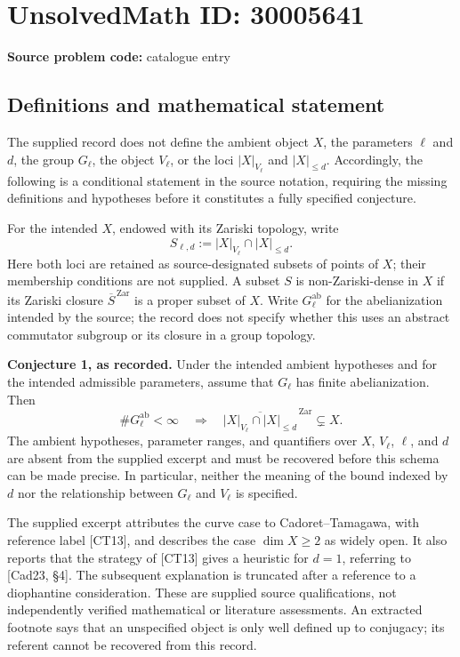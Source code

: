 \documentclass[11pt]{article}
\begin{document}
\section*{UnsolvedMath ID: 30005641}
\textbf{Source problem code:} catalogue entry
\subsection{Definitions and mathematical statement}
The supplied record does not define the ambient object \(X\), the parameters \(\ell\) and \(d\), the group \(G_\ell\), the object \(V_\ell\), or the loci \(|X|_{V_\ell}\) and \(|X|_{\leq d}\). Accordingly, the following is a conditional statement in the source notation, requiring the missing definitions and hypotheses before it constitutes a fully specified conjecture.

For the intended \(X\), endowed with its Zariski topology, write
\[
S_{\ell,d}:=|X|_{V_\ell}\cap |X|_{\leq d}.
\]
Here both loci are retained as source-designated subsets of points of \(X\); their membership conditions are not supplied. A subset \(S\) is non-Zariski-dense in \(X\) if its Zariski closure \(\overline{S}^{\,\mathrm{Zar}}\) is a proper subset of \(X\). Write \(G_\ell^{\mathrm{ab}}\) for the abelianization intended by the source; the record does not specify whether this uses an abstract commutator subgroup or its closure in a group topology.

\textbf{Conjecture 1, as recorded.} Under the intended ambient hypotheses and for the intended admissible parameters, assume that \(G_\ell\) has finite abelianization. Then
\[
\#G_\ell^{\mathrm{ab}}<\infty
\quad\Longrightarrow\quad
\overline{|X|_{V_\ell}\cap |X|_{\leq d}}^{\,\mathrm{Zar}}\subsetneq X.
\]
The ambient hypotheses, parameter ranges, and quantifiers over \(X\), \(V_\ell\), \(\ell\), and \(d\) are absent from the supplied excerpt and must be recovered before this schema can be made precise. In particular, neither the meaning of the bound indexed by \(d\) nor the relationship between \(G_\ell\) and \(V_\ell\) is specified.

The supplied excerpt attributes the curve case to Cadoret--Tamagawa, with reference label [CT13], and describes the case \(\dim X\geq 2\) as widely open. It also reports that the strategy of [CT13] gives a heuristic for \(d=1\), referring to [Cad23, \S 4]. The subsequent explanation is truncated after a reference to a diophantine consideration. These are supplied source qualifications, not independently verified mathematical or literature assessments. An extracted footnote says that an unspecified object is only well defined up to conjugacy; its referent cannot be recovered from this record.
\end{document}

